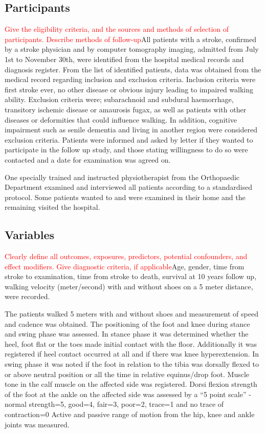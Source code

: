 \documentclass[a4paper,12pt]{article}
\begin{document}
\subsection{Participants}\textcolor{red}{Give the eligibility criteria, and the sources and methods of selection of participants. Describe methods of follow-up}All patients with a stroke, confirmed by a stroke physician and by computer tomography imaging, admitted from July 1st to November 30th, were identified from the hospital medical records and diagnosis register.
From the list of identified patients, data was obtained from the medical record regarding inclusion and exclusion criteria. Inclusion criteria were first stroke ever, no other disease or obvious injury leading to impaired walking ability. Exclusion criteria were; subarachnoid and subdural haemorrhage, transitory ischemic disease or amaurosis fugax, as well as patients with other diseases or deformities that could influence walking. In addition, cognitive impairment such as senile dementia and living in another region were considered exclusion criteria.
Patients were informed and asked by letter if they wanted to participate in the follow up study, and those stating willingness to do so were contacted and a date for examination was agreed on.

One specially trained and instructed physiotherapist from the Orthopaedic Department examined and interviewed all patients according to a standardised protocol. Some patients wanted to and were examined in their home and the remaining visited the hospital. 
\subsection{Variables} \textcolor{red}{Clearly define all outcomes, exposures, predictors, potential confounders, and effect modifiers. Give diagnostic criteria, if applicable}Age, gender, time from stroke to examination, time from stroke to death, survival at 10 years follow up, walking velocity (meter/second) with and without shoes on a 5 meter distance,  were recorded.

The patients walked 5 meters with and without shoes and measurement of speed and cadence was obtained. The positioning of the foot and knee during stance and swing phase was assessed. In stance phase it was determined whether the heel, foot flat or the toes made initial contact with the floor. Additionally it was registered if heel contact occurred at all and if there was knee hyperextension. In swing phase it was noted if the foot in relation to the tibia was dorsally flexed to or above neutral position or all the time in relative equinus/drop foot.                                        
Muscle tone in the calf muscle on the affected side was registered\cite{Ashworth1964}. Dorsi flexion strength of the foot at the ankle on the affected side was assessed by a “5 point scale” - normal strength=5, good=4, fair=3, poor=2, trace=1 and no trace of contraction=0\cite{MRC1975} Active and passive range of motion from the hip, knee and ankle joints was measured.
\end{document}
